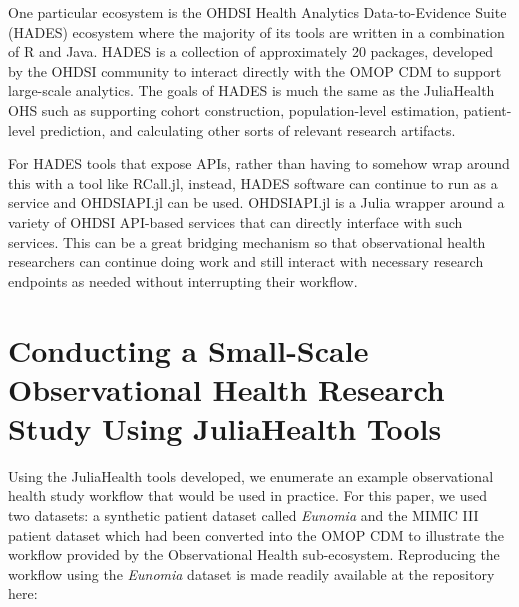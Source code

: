 \documentclass{juliacon}
\begin{document}
One particular ecosystem is the OHDSI Health Analytics Data-to-Evidence Suite (HADES) ecosystem where the majority of its tools are written in a combination of R and Java.
HADES is a collection of approximately 20 packages, developed by the OHDSI community to interact directly with the OMOP CDM to support large-scale analytics.
The goals of HADES is much the same as the JuliaHealth OHS such as supporting cohort construction, population-level estimation, patient-level prediction, and calculating other sorts of relevant research artifacts.

For HADES tools that expose APIs, rather than having to somehow wrap around this with a tool like RCall.jl, instead, HADES software can continue to run as a service and OHDSIAPI.jl can be used.
OHDSIAPI.jl is a Julia wrapper around a variety of OHDSI API-based services that can directly interface with such services.
This can be a great bridging mechanism so that observational health researchers can continue doing work and still interact with necessary research endpoints as needed without interrupting their workflow.

\section{Conducting a Small-Scale Observational Health Research Study Using JuliaHealth Tools}

Using the JuliaHealth tools developed, we enumerate an example observational health study workflow that would be used in practice.\footnotemark
For this paper, we used two datasets: a synthetic patient dataset called \textit{Eunomia} and the MIMIC III patient dataset which had been converted into the OMOP CDM to illustrate the workflow provided by the Observational Health sub-ecosystem.
Reproducing the workflow using the \textit{Eunomia} dataset is made readily available at the repository here: \cite{schuemieEunomia2023}

\end{document}
